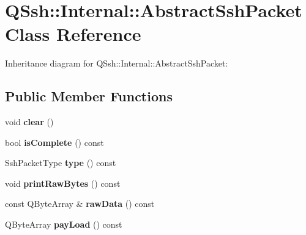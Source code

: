 \hypertarget{class_q_ssh_1_1_internal_1_1_abstract_ssh_packet}{}\section{Q\+Ssh\+:\+:Internal\+:\+:Abstract\+Ssh\+Packet Class Reference}
\label{class_q_ssh_1_1_internal_1_1_abstract_ssh_packet}


Inheritance diagram for Q\+Ssh\+:\+:Internal\+:\+:Abstract\+Ssh\+Packet\+:
\subsection*{Public Member Functions}
\begin{DoxyCompactItemize}
\item 
\mbox{\label{class_q_ssh_1_1_internal_1_1_abstract_ssh_packet_a28515b86958d86ce7b802162f56f1459}} 
void {\bfseries clear} ()
\item 
\mbox{\label{class_q_ssh_1_1_internal_1_1_abstract_ssh_packet_af796f5286507c0f83419b7c81f5bbe2b}} 
bool {\bfseries is\+Complete} () const
\item 
\mbox{\label{class_q_ssh_1_1_internal_1_1_abstract_ssh_packet_a5a7ffa3b2bfb49e631027429eac4e6f4}} 
Ssh\+Packet\+Type {\bfseries type} () const
\item 
\mbox{\label{class_q_ssh_1_1_internal_1_1_abstract_ssh_packet_a0820171969c5207b251dacfe5809eaec}} 
void {\bfseries print\+Raw\+Bytes} () const
\item 
\mbox{\label{class_q_ssh_1_1_internal_1_1_abstract_ssh_packet_a3e6a87309e6a9adbf71234058fa4341b}} 
const Q\+Byte\+Array \& {\bfseries raw\+Data} () const
\item 
\mbox{\label{class_q_ssh_1_1_internal_1_1_abstract_ssh_packet_ac8e6b31985439cdd23918f37d28df89a}} 
Q\+Byte\+Array {\bfseries pay\+Load} () const
\end{DoxyCompactItemize}
